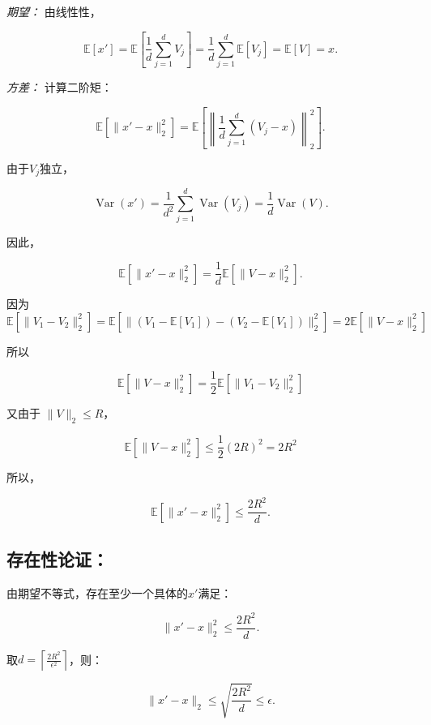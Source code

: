 \documentclass{article}
\begin{document}
\textit{期望：} 由线性性，

\[
\mathbb{E}[x'] = \mathbb{E}\left[ \frac{1}{d} \sum_{j=1}^{d} V_j \right] = \frac{1}{d} \sum_{j=1}^{d} \mathbb{E}[V_j] = \mathbb{E}[V] = x.
\]

\textit{方差：} 计算二阶矩：

\[
\mathbb{E}[\| x' - x \|_2^2] = \mathbb{E}\left[ \left\| \frac{1}{d} \sum_{j=1}^{d} (V_j - x) \right\|_2^2 \right].
\]

由于\( V_j \)独立，

\[
\operatorname{Var}(x') = \frac{1}{d^2} \sum_{j=1}^{d} \operatorname{Var}(V_j) = \frac{1}{d} \operatorname{Var}(V).
\]

因此，

\[
\mathbb{E}[\| x' - x \|_2^2] = \frac{1}{d} \mathbb{E}[\| V - x \|_2^2].
\]


因为 
\[
\mathbb{E}[\| V_1 - V_2 \|_2^2] = \mathbb{E}[\|( V_1- \mathbb{E}[V_1])- (V_2- \mathbb{E}[V_1]) \|_2^2]  = 2\mathbb{E}[\| V - x \|_2^2]
\]

所以 

\[
\mathbb{E}[\| V - x \|_2^2] = \frac{1}{2}  \mathbb{E}[\| V_1 - V_2 \|_2^2]
\]

又由于 \( \| V \|_2 \leq R \)，

\[
 \mathbb{E}[\| V - x \|_2^2] \leq   \frac{1}{2} (2R)^2 =2R^2
\]


所以，

\[
\mathbb{E}[\| x' - x \|_2^2] \leq \frac{2R^2}{d}.
\]

\subsection{存在性论证：}
由期望不等式，存在至少一个具体的\( x' \)满足：

\[
\| x' - x \|_2^2 \leq \frac{2R^2}{d}.
\]

取\( d = \left\lceil \frac{2R^2}{\epsilon^2} \right\rceil \)，则：

\[
\| x' - x \|_2 \leq \sqrt{ \frac{2R^2}{d} } \leq \epsilon.
\]
\end{document}
